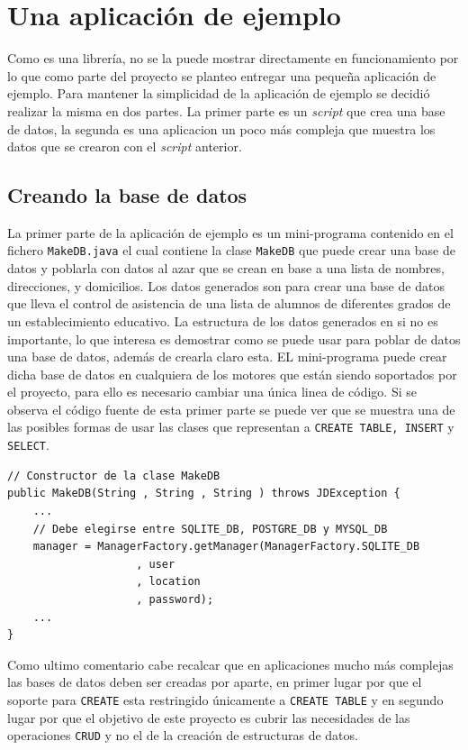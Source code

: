 \chapter{Una aplicación de ejemplo}
Como \jj es una librería, no se la puede mostrar directamente en funcionamiento por lo que como parte del proyecto se planteo entregar una pequeña aplicación de ejemplo. Para mantener la simplicidad de la aplicación de ejemplo se decidió realizar la misma en dos partes. La primer parte es un \textit{script} que crea una base de datos, la segunda es una aplicacion un poco más compleja que muestra los datos que se crearon con el \textit{script} anterior.
\section{Creando la base de datos}
La primer parte de la aplicación de ejemplo es un mini-programa contenido en el fichero \verb=MakeDB.java= el cual contiene la clase \verb=MakeDB= que puede crear una base de datos y poblarla con datos al azar que se crean en base a una lista de nombres, direcciones, y domicilios. Los datos generados son para crear una base de datos que lleva el control de asistencia de una lista de alumnos de diferentes grados de un establecimiento educativo. La estructura de los datos generados en si no es importante, lo que interesa es demostrar como se puede usar \jj para poblar de datos una base de datos, además de crearla claro esta. EL mini-programa puede crear dicha base de datos en cualquiera de los motores que están siendo soportados por el proyecto, para ello es necesario cambiar una única linea de código. Si se observa el código fuente de esta primer parte se puede ver que se muestra una de las posibles formas de usar las clases que representan a \verb=CREATE TABLE, INSERT= y \verb=SELECT=.
\begin{lstlisting}[title=Código que debe alterarse para elegir el motor.]
// Constructor de la clase MakeDB
public MakeDB(String , String , String ) throws JDException {
	...
	// Debe elegirse entre SQLITE_DB, POSTGRE_DB y MYSQL_DB
	manager = ManagerFactory.getManager(ManagerFactory.SQLITE_DB
					, user
					, location
					, password);
	...
}
\end{lstlisting}

Como ultimo comentario cabe recalcar que en aplicaciones mucho más complejas las bases de datos deben ser creadas por aparte, en primer lugar por que el soporte para \verb=CREATE= esta restringido únicamente a \verb=CREATE TABLE= y en segundo lugar por que el objetivo de este proyecto es cubrir las necesidades de las operaciones \verb=CRUD= y no el de la creación de estructuras de datos.
